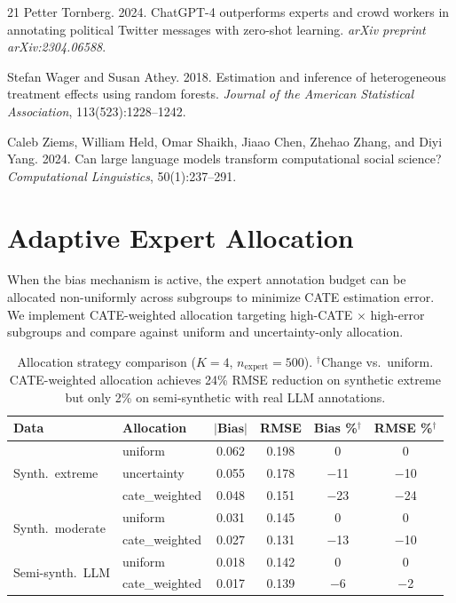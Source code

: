 \documentclass[11pt,a4paper]{article}
\begin{document}
\begin{thebibliography}{21}
Petter Tornberg.
2024.
{ChatGPT-4} outperforms experts and crowd workers in annotating political {Twitter} messages with zero-shot learning.
{\em arXiv preprint arXiv:2304.06588}.

Stefan Wager and Susan Athey.
2018.
Estimation and inference of heterogeneous treatment effects using random forests.
{\em Journal of the American Statistical Association}, 113(523):1228--1242.

Caleb Ziems, William Held, Omar Shaikh, Jiaao Chen, Zhehao Zhang, and Diyi Yang.
2024.
Can large language models transform computational social science?
{\em Computational Linguistics}, 50(1):237--291.

\end{thebibliography}

\clearpage
\appendix

\section{Adaptive Expert Allocation}
\label{app:allocation}

When the bias mechanism is active, the expert annotation budget can be allocated non-uniformly across subgroups to minimize CATE estimation error.
We implement CATE-weighted allocation targeting high-CATE $\times$ high-error subgroups and compare against uniform and uncertainty-only allocation.

\begin{table}[h]
\centering
\small
\begin{tabular}{@{}llcccc@{}}
\toprule
\textbf{Data} & \textbf{Allocation} & $|\textbf{Bias}|$ & \textbf{RMSE} & \textbf{Bias \%}$^\dagger$ & \textbf{RMSE \%}$^\dagger$ \\
\midrule
\multirow{3}{*}{Synth.\ extreme} & uniform & 0.062 & 0.198 & 0 & 0 \\
 & uncertainty & 0.055 & 0.178 & $-$11 & $-$10 \\
 & cate\_weighted & 0.048 & 0.151 & $-$23 & $-$24 \\
\midrule
\multirow{2}{*}{Synth.\ moderate} & uniform & 0.031 & 0.145 & 0 & 0 \\
 & cate\_weighted & 0.027 & 0.131 & $-$13 & $-$10 \\
\midrule
\multirow{2}{*}{Semi-synth.\ LLM} & uniform & 0.018 & 0.142 & 0 & 0 \\
 & cate\_weighted & 0.017 & 0.139 & $-$6 & $-$2 \\
\bottomrule
\end{tabular}
\caption{Allocation strategy comparison ($K=4$, $n_{\text{expert}}=500$). $^\dagger$Change vs.\ uniform. CATE-weighted allocation achieves 24\% RMSE reduction on synthetic extreme but only 2\% on semi-synthetic with real LLM annotations.}
\label{tab:allocation}
\end{table}
\end{document}
